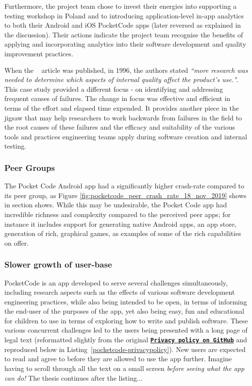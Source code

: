 Furthermore, the project team chose to invest their energies into supporting a testing workshop in Poland and to introducing application-level in-app analytics to both their Android and iOS PocketCode apps (later reversed as explained in the discussion). Their actions indicate the project team recognise the benefits of applying and incorporating analytics into their software development and quality improvement practices.

When the ~\citep{kitchenham1996_software_quality_elusive_target} article was published, in 1996, the authors stated \emph{``more research was needed to determine which aspects of internal quality affect the product's use."}. This case study provided a different focus - on identifying and addressing frequent causes of failures. The change in focus was effective and efficient in terms of the effort and elapsed time expended. It provides another piece in the jigsaw that may help researchers to work backwards from failures in the field to the root causes of these failures and the efficacy and suitability of the various tools and practices engineering teams apply during software creation and internal testing.

\subsubsection{Peer Groups}
The Pocket Code Android app had a significantly higher crash-rate compared to its peer group, as Figure \ref{fig:pocketcode_peer_crash_rate_18_nov_2019} shows in section \href{android-vitals-peer-groups}{\emph{}} shows. While this may be undesirable, the Pocket Code app had incredible richness and complexity compared to the perceived peer apps; for instance it includes support for generating native Android apps, an app store, generation of rich, graphical games, as examples of some of the rich capabilities on offer.


\subsubsection{Slower growth of user-base}
PocketCode is an app developed to serve several challenges simultaneously, including research aspects such as the effects of various software development engineering practices, while also being intended to be open, in terms of informing the end-user of the purposes of the app, yet also being easy, fun and educational for children to use in terms of exploring how to write and publish software. These various concurrent challenges led to the users being presented with a long page of legal text (reformatted slightly from the original \href{https://github.com/Catrobat/Catroid/blob/develop/catroid/src/main/res/values/strings.xml}{\textbf{\texttt{Privacy policy on GitHub}}} and reproduced below in Listing~\ref{pocketcode-privacypolicy}). New users are expected to read and agree to before they are allowed to use the app further. Imagine having to scroll through all the text on a small screen \emph{before seeing what the app can do!} The thesis continues after the listing...


